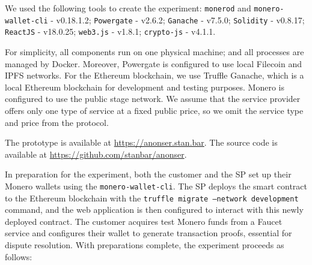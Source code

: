 \documentclass[pdftex,twocolumn,epjc3]{svjour3}
\begin{document}
We used the following tools to create the experiment:
\texttt{monerod} and \texttt{monero-wallet-cli} - v0.18.1.2; \texttt{Powergate} - v2.6.2; \texttt{Ganache} - v7.5.0; \texttt{Solidity} - v0.8.17; \texttt{ReactJS} - v18.0.25; \texttt{web3.js} - v1.8.1; \texttt{crypto-js} - v4.1.1.

For simplicity, all components run on one physical machine; and all processes are managed by Docker. 
Moreover, Powergate is configured to use local Filecoin and IPFS networks.
For the Ethereum blockchain, we use Truffle Ganache, which is a local Ethereum blockchain for development and testing purposes. 
Monero is configured to use the public stage network.
We assume that the service provider offers only one type of service at a fixed public price, so we omit the service type and price from the protocol.

The prototype is available at \url{https://anonser.stan.bar}. The source code is available at \url{https://github.com/stanbar/anonser}.

In preparation for the experiment, both the customer and the SP set up their Monero wallets using the \texttt{monero-wallet-cli}. The SP deploys the smart contract to the Ethereum blockchain with the \texttt{truffle migrate --network development} command, and the web application is then configured to interact with this newly deployed contract.
The customer acquires test Monero funds from a Faucet service and configures their wallet to generate transaction proofs, essential for dispute resolution.
With preparations complete, the experiment proceeds as follows:
\end{document}
